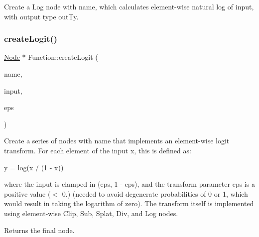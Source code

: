 Create a Log node with {\ttfamily name}, which calculates element-\/wise natural log of {\ttfamily input}, with output type {\ttfamily out\+Ty}. \mbox{\label{classglow_1_1_function_a81e3b70fd3322cc3ae6f733c7c818ff2}} 
\subsubsection{\texorpdfstring{create\+Logit()}{createLogit()}}
{\footnotesize\ttfamily \hyperlink{classglow_1_1_node}{Node} $\ast$ Function\+::create\+Logit (\begin{DoxyParamCaption}\item[{llvm\+::\+String\+Ref}]{name,  }\item[{\hyperlink{structglow_1_1_node_value}{Node\+Value}}]{input,  }\item[{float}]{eps }\end{DoxyParamCaption})}

Create a series of nodes with {\ttfamily name} that implements an element-\/wise logit transform. For each element of the {\ttfamily input} x, this is defined as\+:

y = log(x / (1 -\/ x))

where the {\ttfamily input} is clamped in ({\ttfamily eps}, 1 -\/ {\ttfamily eps}), and the transform parameter {\ttfamily eps} is a positive value ($<$ 0.) (needed to avoid degenerate probabilities of 0 or 1, which would result in taking the logarithm of zero). The transform itself is implemented using element-\/wise Clip, Sub, Splat, Div, and Log nodes. \begin{DoxyReturn}{Returns}
the final node. 
\end{DoxyReturn}
\mbox{\label{classglow_1_1_function_a031dffcebc9798d481beaefaa927db61}} 
